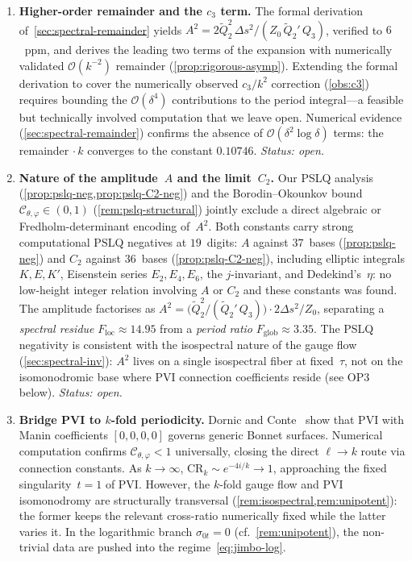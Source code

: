 \documentclass[11pt,a4paper]{article}
\theoremstyle{plain}
\theoremstyle{definition}
\theoremstyle{remark}
\newcommand{\Oo}{\mathcal{O}}
\begin{document}
\begin{enumerate}[label=\textbf{OP\arabic*.},nosep]
\item \textbf{Higher-order remainder and the $c_3$ term.}
  The formal derivation of~\cref{sec:spectral-remainder} yields
  $A^2 = 2\tilde Q_2^2\,\Delta s^2 / (Z_0\,\tilde Q_2'\,Q_3)$,
  verified to $6$~ppm, and derives the leading two terms of
  the expansion with numerically validated $\Oo(k^{-2})$ remainder
  (\cref{prop:rigorous-asymp}).  Extending the formal
  derivation to cover the numerically observed $c_3/k^2$
  correction (\cref{obs:c3}) requires bounding the
  $\Oo(\delta^4)$ contributions to the period integral---a
  feasible but technically involved computation that we
  leave open.
  Numerical evidence (\cref{sec:spectral-remainder}) confirms
  the absence of $\Oo(\delta^2 \log \delta)$ terms: the remainder
  $\cdot\,k$ converges to the constant $0.10746$.
  \emph{Status: open.}

\item \textbf{Nature of the amplitude~$A$ and the limit~$C_2$.}
  Our PSLQ analysis (\cref{prop:pslq-neg,prop:pslq-C2-neg}) and the
  Borodin--Okounkov bound
  $\mathcal{C}_{\theta,\varphi} \in (0,1)$
  (\cref{rem:pslq-structural}) jointly exclude a direct
  algebraic or Fredholm-determinant encoding of~$A^2$.
  Both constants carry strong computational PSLQ negatives
  at $19$~digits: $A$ against $37$~bases
  (\cref{prop:pslq-neg}) and $C_2$ against $36$~bases
  (\cref{prop:pslq-C2-neg}), including elliptic integrals
  $K, E, K'$, Eisenstein series $E_2, E_4, E_6$, the
  $j$-invariant, and Dedekind's~$\eta$: no low-height
  integer relation involving $A$ or $C_2$ and these
  constants was found.
  The amplitude factorises as
  $A^2 = \bigl(\tilde Q_2^2/(\tilde Q_2'\,Q_3)\bigr)
         \cdot 2\Delta s^2/Z_0$,
  separating a \emph{spectral residue}
  $F_{\mathrm{loc}} \approx 14.95$
  from a \emph{period ratio}
  $F_{\mathrm{glob}} \approx 3.35$.
  The PSLQ negativity is consistent with the
  isospectral nature of the gauge flow
  (\cref{sec:spectral-inv}): $A^2$ lives on a single
  isospectral fiber at fixed~$\tau$, not on the
  isomonodromic base where PVI connection coefficients
  reside (see OP3 below).
  \emph{Status: open.}

\item \textbf{Bridge PVI to $k$-fold periodicity.}
  Dornic and Conte~\cite{DC26} show that PVI with Manin
  coefficients $[0,0,0,0]$ governs generic Bonnet surfaces.
  Numerical computation confirms
  $\mathcal{C}_{\theta,\varphi}<1$ universally, closing
  the direct $\ell\to k$ route via connection constants.
  As $k\to\infty$, $\mathrm{CR}_k \sim e^{-4i/k}\to 1$,
  approaching the fixed singularity~$t=1$ of PVI.
  However, the $k$-fold gauge flow and PVI isomonodromy
  are structurally transversal
  (\cref{rem:isospectral,rem:unipotent}): the former
  keeps the relevant cross-ratio numerically fixed while the latter varies it.
  In the logarithmic branch $\sigma_{0t}=0$
  (cf.\ \cref{rem:unipotent}), the non-trivial data are pushed into
  the regime~\eqref{eq:jimbo-log}.


\end{enumerate}
\end{document}
